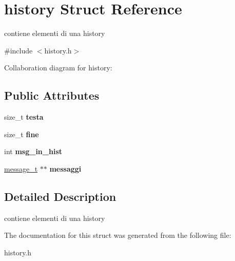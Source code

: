 \hypertarget{structhistory}{}\section{history Struct Reference}
\label{structhistory}


contiene elementi di una history  




{\ttfamily \#include $<$history.\+h$>$}



Collaboration diagram for history\+:
\subsection*{Public Attributes}
\begin{DoxyCompactItemize}
\item 
size\+\_\+t {\bfseries testa}\hypertarget{structhistory_a55d141af96e8de23c1191d25e5b24a39}{}\label{structhistory_a55d141af96e8de23c1191d25e5b24a39}

\item 
size\+\_\+t {\bfseries fine}\hypertarget{structhistory_a98f77508c47cb98493536d352f9d1789}{}\label{structhistory_a98f77508c47cb98493536d352f9d1789}

\item 
int {\bfseries msg\+\_\+in\+\_\+hist}\hypertarget{structhistory_a6b43ee7a9274a8d21d52fdee02d964f9}{}\label{structhistory_a6b43ee7a9274a8d21d52fdee02d964f9}

\item 
\hyperlink{structmessage__t}{message\+\_\+t} $\ast$$\ast$ {\bfseries messaggi}\hypertarget{structhistory_ad8cd842086047e93449e75da7842377f}{}\label{structhistory_ad8cd842086047e93449e75da7842377f}

\end{DoxyCompactItemize}


\subsection{Detailed Description}
contiene elementi di una history 

The documentation for this struct was generated from the following file\+:\begin{DoxyCompactItemize}
\item 
history.\+h\end{DoxyCompactItemize}
